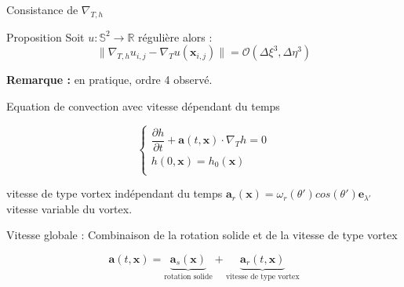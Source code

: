 \documentclass[11pt]{beamer}
\begin{document}
\begin{frame}{Consistance de $\nabla_{T,h}$}

\begin{block}{Proposition}
Soit $u : \mathbb{S}^2 \rightarrow \mathbb{R}$ régulière alors :
\begin{equation*}
\| \nabla_{T,h} u_{i,j} - \nabla_T u (\mathbf{x}_{i,j}) \| = \mathcal{O} \left( \Delta \xi^3, \Delta \eta^3 \right)
\end{equation*}
\end{block}

\textbf{Remarque :} en pratique, ordre 4 observé.

\end{frame}






\begin{frame}{Equation de convection avec vitesse dépendant du temps}

\begin{block}{}
\begin{equation}
\left \{
\begin{array}{l}
\dfrac{\partial h}{\partial t} + \mathbf{a}(t,\mathbf{x}) \cdot \nabla_T h = 0\\[6pt]
h(0,\mathbf{x}) = h_0(\mathbf{x})\\
\end{array}
\right.
\label{eq:advection}
\end{equation}
\end{block}

\begin{block}{vitesse de type vortex indépendant du temps}
$\mathbf{a}_r(\mathbf{x}) = \omega_r (\theta') cos ( \theta') \mathbf{e}_{\lambda'}$ vitesse variable du vortex.
\end{block}


\begin{block}{Vitesse globale :
Combinaison de la rotation solide et de la vitesse de type vortex}

$$\mathbf{a}(t, \mathbf{x}) = \underbrace{\mathbf{a}_s ( \mathbf{x} )}_{\text{rotation solide}} + \underbrace{\mathbf{a}_r (t, \mathbf{x})}_{\text{vitesse de type vortex}}$$




\begin{flushright}
\end{flushright}
\end{block}

\end{frame}
\end{document}
